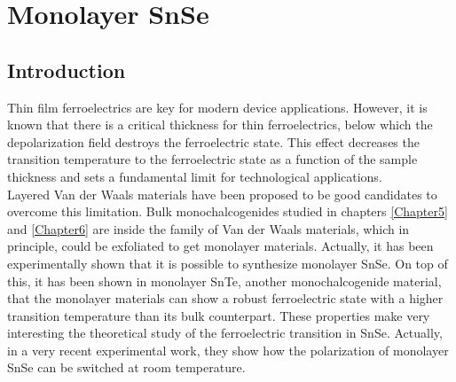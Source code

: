 
\chapter{Monolayer SnSe} %

\label{Chapter7} %




\section{Introduction}

Thin film ferroelectrics are key for modern device applications\cite{lallart2011ferroelectrics}. However, it is 
known that there is a critical thickness for thin ferroelectrics, below which the depolarization field destroys the 
ferroelectric state\cite{batra1973new,zhong1994giant,dawber2005physics}. This effect decreases the transition 
temperature to the ferroelectric state as a function of the sample 
thickness\cite{fong2004ferroelectricity,fong2006stabilization} and sets a fundamental limit for technological  
applications. \\

Layered Van der Waals materials have been proposed to be good candidates to overcome this 
limitation\cite{shirodkar2014emergence,fei2016ferroelectricity}. 
Bulk monochalcogenides studied in chapters \ref{Chapter5} and \ref{Chapter6} are inside the family of Van der Waals 
materials, which in principle, could be exfoliated to get monolayer materials. Actually, it has been experimentally 
shown that it is possible to synthesize monolayer SnSe\cite{li2013single,zhao2015controlled}. On top of this, it has 
been shown in monolayer SnTe, another monochalcogenide material, that the monolayer materials can show a robust 
ferroelectric state with a higher transition temperature than its bulk counterpart\cite{chang2016discovery}. These 
properties make very interesting the theoretical study of the ferroelectric transition in SnSe. Actually, in a very 
recent experimental work\cite{chang2020controlled}, they show how the polarization of monolayer SnSe can be switched 
at room temperature. \\

